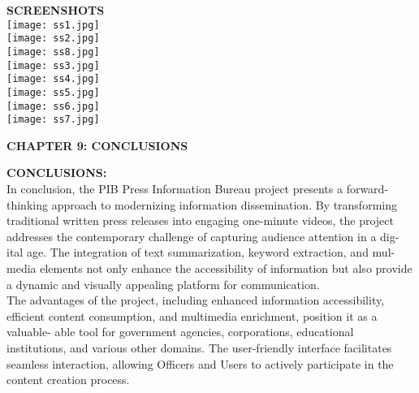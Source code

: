 \documentclass[12pt]{article}
\begin{document}
\bigskip

\justify \textbf{\fontsize{12}{12} SCREENSHOTS }
\\
\noindent \justify \texttt{[image: ss1.jpg]}\\
\noindent \justify \texttt{[image: ss2.jpg]}\\
\noindent \justify \texttt{[image: ss8.jpg]}\\
\noindent \justify \texttt{[image: ss3.jpg]}\\
\noindent \justify \texttt{[image: ss4.jpg]}\\
\noindent \justify \texttt{[image: ss5.jpg]}\\
\noindent \justify \texttt{[image: ss6.jpg]}\\
\noindent \justify \texttt{[image: ss7.jpg]}\\


\bigskip

\pagebreak{}
\begin{center} \fontsize{14}{14} \textbf{CHAPTER 9: CONCLUSIONS } \end{center}

\justify \textbf{\fontsize{12}{12} CONCLUSIONS: }\\

In conclusion, the PIB Press Information Bureau project presents a forward-
thinking approach to modernizing information dissemination. By transforming
traditional written press releases into engaging one-minute videos, the project
addresses the contemporary challenge of capturing audience attention in a dig-
ital age. The integration of text summarization, keyword extraction, and mul-
media elements not only enhance the accessibility of information but also
provide a dynamic and visually appealing platform for communication.\\

The advantages of the project, including enhanced information accessibility,
efficient content consumption, and multimedia enrichment, position it as a valuable-
able tool for government agencies, corporations, educational institutions, and
various other domains. The user-friendly interface facilitates seamless interaction, allowing Officers and Users to actively participate in the content creation
process.\\
\end{document}
